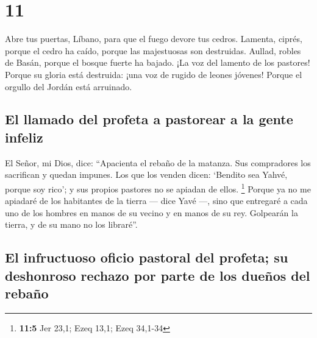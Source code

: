 \hypertarget{section-10}{%
\section{11}\label{section-10}}

 Abre tus puertas, Líbano, para que el fuego devore tus
cedros.  Lamenta, ciprés, porque el cedro ha caído, porque
las majestuosas son destruidas. Aullad, robles de Basán, porque el
bosque fuerte ha bajado.  ¡La voz del lamento de los
pastores! Porque su gloria está destruida: ¡una voz de rugido de leones
jóvenes! Porque el orgullo del Jordán está arruinado.

\hypertarget{el-llamado-del-profeta-a-pastorear-a-la-gente-infeliz}{%
\subsection{El llamado del profeta a pastorear a la gente
infeliz}\label{el-llamado-del-profeta-a-pastorear-a-la-gente-infeliz}}

 El Señor, mi Dios, dice: ``Apacienta el rebaño de la
matanza.  Sus compradores los sacrifican y quedan impunes.
Los que los venden dicen: `Bendito sea Yahvé, porque soy rico'; y sus
propios pastores no se apiadan de ellos. \footnote{\textbf{11:5} Jer
  23,1; Ezeq 13,1; Ezeq 34,1-34}  Porque ya no me apiadaré
de los habitantes de la tierra --- dice Yavé ---, sino que entregaré a
cada uno de los hombres en manos de su vecino y en manos de su rey.
Golpearán la tierra, y de su mano no los libraré''.

\hypertarget{el-infructuoso-oficio-pastoral-del-profeta-su-deshonroso-rechazo-por-parte-de-los-dueuxf1os-del-rebauxf1o}{%
\subsection{El infructuoso oficio pastoral del profeta; su deshonroso
rechazo por parte de los dueños del
rebaño}\label{el-infructuoso-oficio-pastoral-del-profeta-su-deshonroso-rechazo-por-parte-de-los-dueuxf1os-del-rebauxf1o}}

